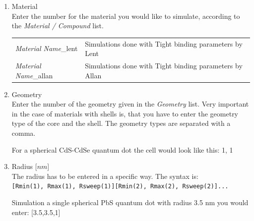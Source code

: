 			\begin{enumerate}
				\item Material		\\
							Enter the number for the material you would like to simulate, according to the {\it Material / Compound} list. \\
							\begin{tabular}{ll}
								{\it Material Name}\_lent		&	Simulations done with Tight binding parameters by Lent	\\
								{\it Material Name}\_allan	&	Simulations done with Tight binding parameters by Allan	\\
							\end{tabular}
				\item Geometry		\\
							Enter the number of the geometry given in the {\it Geometry} list. Very important in the case of materials with
							shells is, that you have to enter the geometry type of the core and the shell. The geometry types are separated	
							with a comma.
							\begin{EXAMPLE}
								For a spherical CdS-CdSe quantum dot the cell would look like this: 1, 1
							\end{EXAMPLE}
				\item Radius [$nm$]			\\
							The radius has to be entered in a specific way. The syntax is: \\
							\lstinline{[Rmin(1), Rmax(1), Rsweep(1)][Rmin(2), Rmax(2), Rsweep(2)]...} \\
							\newline
							
							\begin{EXAMPLE}
								Simulation a single spherical PbS quantum dot with radius 3.5 nm you would enter: [3.5,3.5,1]
							\end{EXAMPLE}
							

\end{enumerate}
